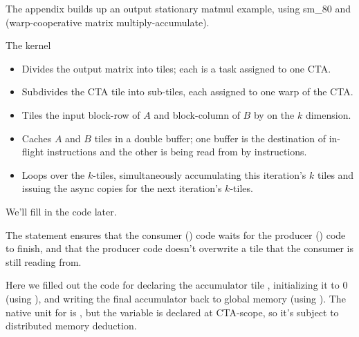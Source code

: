 
\filbreak
{}


\filbreak
{}


\vfill
{}

The appendix builds up an output stationary matmul example, using sm\_80  and  (warp-cooperative matrix multiply-accumulate).

The kernel
\begin{itemize}
  \item Divides the output matrix into  tiles; each is a task assigned to one CTA.
  \item Subdivides the CTA tile into sub-tiles, each assigned to one warp of the CTA.
  \item Tiles the input block-row of $A$ and block-column of $B$ by  on the $k$ dimension.
  \item Caches $A$ and $B$ tiles in a double buffer; one buffer is the destination of in-flight  instructions and the other is being read from by  instructions.
  \item Loops over the $k$-tiles, simultaneously accumulating this iteration's $k$ tiles and issuing the async copies for the next iteration's $k$-tiles.
\end{itemize}

\newpage
{}

We'll fill in the  code later.

The \texttt{} statement ensures that the consumer () code waits for the producer () code to finish, and that the producer code doesn't overwrite a tile that the consumer is still reading from.



\newpage
{}

Here we filled out the code for declaring the accumulator tile , initializing it to 0 (using ), and writing the final accumulator back to global memory (using ). The native unit for  is , but the variable is declared at CTA-scope, so it's subject to distributed memory deduction.

